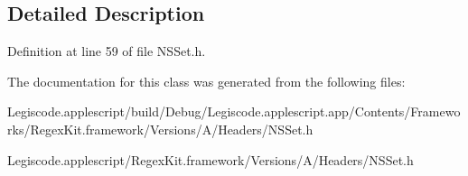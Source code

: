 \subsection{Detailed Description}


Definition at line 59 of file N\-S\-Set.\-h.



The documentation for this class was generated from the following files\-:\begin{DoxyCompactItemize}
\item 
Legiscode.\-applescript/build/\-Debug/\-Legiscode.\-applescript.\-app/\-Contents/\-Frameworks/\-Regex\-Kit.\-framework/\-Versions/\-A/\-Headers/N\-S\-Set.\-h\item 
Legiscode.\-applescript/\-Regex\-Kit.\-framework/\-Versions/\-A/\-Headers/N\-S\-Set.\-h\end{DoxyCompactItemize}

